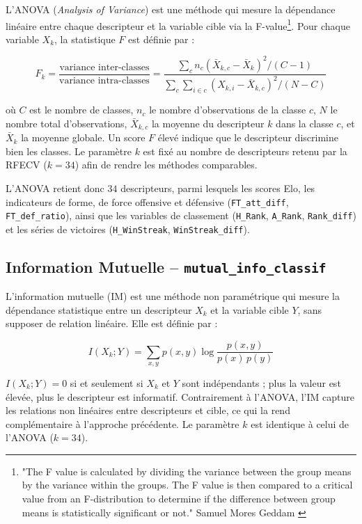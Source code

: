 L'ANOVA (\textit{Analysis of Variance}) est une méthode qui mesure la
dépendance linéaire entre chaque descripteur et la variable cible via la 
F-value\footnote{"The F value is calculated by dividing the variance between the group 
means by the variance within the groups. The F value is then compared to a critical value 
from an F-distribution to determine if the difference between group means is statistically 
significant or not." Samuel Mores Geddam \cite{postfvalue}}. 
Pour chaque variable $X_k$, la statistique $F$ est définie par :

\begin{equation}
    F_k = \frac{\text{variance inter-classes}}{\text{variance intra-classes}}
    = \frac{\sum_c n_c (\bar{X}_{k,c} - \bar{X}_k)^2 / (C-1)}
           {\sum_c \sum_{i \in c} (X_{k,i} - \bar{X}_{k,c})^2 / (N-C)}
\end{equation}

\noindent où $C$ est le nombre de classes, $n_c$ le nombre d'observations de la classe $c$, $N$ le
nombre total d'observations, $\bar{X}_{k,c}$ la moyenne du descripteur $k$ dans la classe
$c$, et $\bar{X}_k$ la moyenne globale. Un score $F$ élevé indique que le descripteur
discrimine bien les classes. Le paramètre $k$ est fixé au nombre de descripteurs retenu
par la RFECV ($k = 34$) afin de rendre les méthodes comparables.

L'ANOVA retient donc $34$ descripteurs, parmi lesquels les scores Elo, les indicateurs de
forme, de force offensive et défensive (\texttt{FT\_att\_diff}, \texttt{FT\_def\_ratio}),
ainsi que les variables de classement (\texttt{H\_Rank}, \texttt{A\_Rank},
\texttt{Rank\_diff}) et les séries de victoires (\texttt{H\_WinStreak},
\texttt{WinStreak\_diff}).

\subsection{Information Mutuelle -- \texttt{mutual\_info\_classif}}

L'information mutuelle (IM) est une méthode non paramétrique qui mesure
la dépendance statistique entre un descripteur $X_k$ et la variable cible $Y$, sans supposer
de relation linéaire. Elle est définie par :

\begin{equation}
    I(X_k ; Y) = \sum_{x,y} p(x,y) \log \frac{p(x,y)}{p(x)\,p(y)}
\end{equation}

\noindent $I(X_k ; Y) = 0$ si et seulement si $X_k$ et $Y$ sont indépendants ; plus la valeur est
élevée, plus le descripteur est informatif. Contrairement à l'ANOVA, l'IM capture les
relations non linéaires entre descripteurs et cible, ce qui la rend complémentaire à
l'approche précédente. Le paramètre $k$ est identique à celui de l'ANOVA ($k = 34$).

